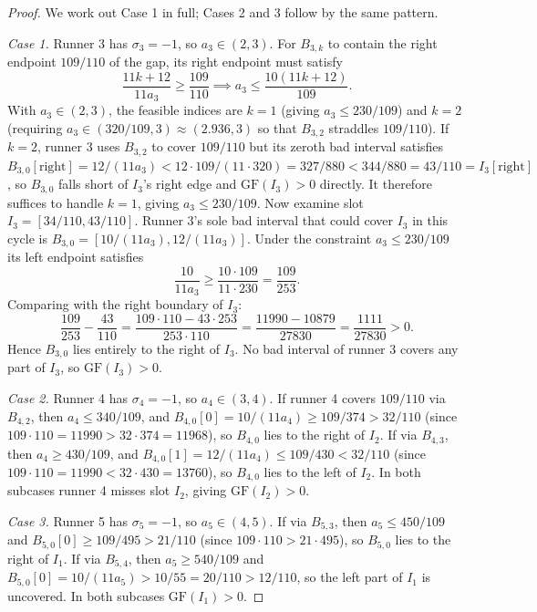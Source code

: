 \documentclass[12pt]{article}
\begin{document}
\begin{proof}
We work out Case 1 in full; Cases 2 and 3 follow by the same pattern.

\emph{Case 1.} Runner 3 has $\sigma_3=-1$, so $a_3\in(2,3)$. For $B_{3,k}$ to contain
the right endpoint $109/110$ of the gap, its right endpoint must satisfy
\[
\frac{11k+12}{11a_3} \ge \frac{109}{110} \implies a_3 \le \frac{10(11k+12)}{109}.
\]
With $a_3\in(2,3)$, the feasible indices are $k=1$ (giving $a_3\le 230/109$) and $k=2$
(requiring $a_3\in(320/109,3)\approx(2.936,3)$ so that $B_{3,2}$ straddles $109/110$).
If $k=2$, runner 3 uses $B_{3,2}$ to cover $109/110$ but its zeroth bad interval satisfies
$B_{3,0}[\text{right}]=12/(11a_3)<12\cdot 109/(11\cdot 320)=327/880<344/880=43/110=I_3[\text{right}]$,
so $B_{3,0}$ falls short of $I_3$'s right edge and $\mathrm{GF}(I_3)>0$ directly.
It therefore suffices to handle $k=1$, giving $a_3\le 230/109$.
Now examine slot $I_3=[34/110,43/110]$. Runner 3's sole bad interval that could cover
$I_3$ in this cycle is $B_{3,0}=[10/(11a_3),12/(11a_3)]$. Under the constraint
$a_3\le 230/109$ its left endpoint satisfies
\[
\frac{10}{11a_3} \ge \frac{10\cdot 109}{11\cdot 230} = \frac{109}{253}.
\]
Comparing with the right boundary of $I_3$:
\[
\frac{109}{253} - \frac{43}{110}
  = \frac{109\cdot 110 - 43\cdot 253}{253\cdot 110}
  = \frac{11990-10879}{27830}
  = \frac{1111}{27830} > 0.
\]
Hence $B_{3,0}$ lies entirely to the right of $I_3$. No bad interval of runner 3 covers
any part of $I_3$, so $\mathrm{GF}(I_3)>0$.

\emph{Case 2.} Runner 4 has $\sigma_4=-1$, so $a_4\in(3,4)$. If runner 4 covers $109/110$
via $B_{4,2}$, then $a_4\le 340/109$, and $B_{4,0}[0]=10/(11a_4)\ge 109/374>32/110$
(since $109\cdot 110=11990>32\cdot 374=11968$), so $B_{4,0}$ lies to the right of $I_2$.
If via $B_{4,3}$, then $a_4\ge 430/109$, and $B_{4,0}[1]=12/(11a_4)\le 109/430<32/110$
(since $109\cdot 110=11990<32\cdot 430=13760$), so $B_{4,0}$ lies to the left of $I_2$.
In both subcases runner 4 misses slot $I_2$, giving $\mathrm{GF}(I_2)>0$.

\emph{Case 3.} Runner 5 has $\sigma_5=-1$, so $a_5\in(4,5)$. If via $B_{5,3}$, then
$a_5\le 450/109$ and $B_{5,0}[0]\ge 109/495>21/110$ (since $109\cdot 110>21\cdot 495$),
so $B_{5,0}$ lies to the right of $I_1$. If via $B_{5,4}$, then $a_5\ge 540/109$ and
$B_{5,0}[0]=10/(11a_5)>10/55=20/110>12/110$, so the left part of $I_1$ is uncovered.
In both subcases $\mathrm{GF}(I_1)>0$.
\end{proof}
\end{document}
